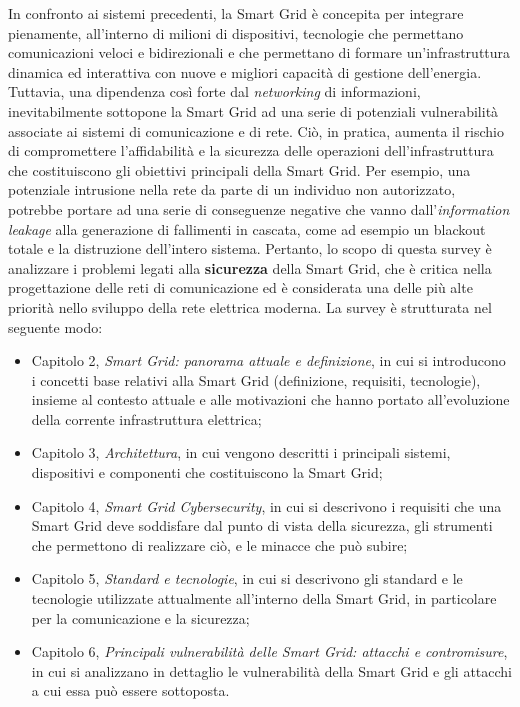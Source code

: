 In confronto ai sistemi precedenti, la Smart Grid è concepita per integrare pienamente, all'interno di milioni di dispositivi, tecnologie che permettano comunicazioni veloci e bidirezionali e che permettano di formare un'infrastruttura dinamica ed interattiva con nuove e migliori capacità di gestione dell'energia. Tuttavia, una dipendenza così forte dal \textit{networking} di informazioni, inevitabilmente sottopone la Smart Grid ad una serie di potenziali vulnerabilità associate ai sistemi di comunicazione e di rete. Ciò, in pratica, aumenta il rischio di compromettere l'affidabilità e la sicurezza delle operazioni dell'infrastruttura che costituiscono gli obiettivi principali della Smart Grid. Per esempio, una potenziale intrusione nella rete da parte di un individuo non autorizzato, potrebbe portare ad una serie di conseguenze negative che vanno dall'\textit{information leakage} alla generazione di fallimenti in cascata, come ad esempio un blackout totale e la distruzione dell'intero sistema. Pertanto, lo scopo di questa survey è analizzare i problemi legati alla \textbf{sicurezza} della Smart Grid, che è critica nella progettazione delle reti di comunicazione ed è considerata una delle più alte priorità nello sviluppo della rete elettrica moderna.
\newline \newline
La survey è strutturata nel seguente modo:
\begin{itemize}
\item Capitolo 2, \textit{Smart Grid: panorama attuale e definizione}, in cui si introducono i concetti base relativi alla Smart Grid (definizione, requisiti, tecnologie), insieme al contesto attuale e alle motivazioni che hanno portato all'evoluzione della corrente infrastruttura elettrica;
\item Capitolo 3, \textit{Architettura}, in cui vengono descritti i principali sistemi, dispositivi e componenti che costituiscono la Smart Grid;
\item Capitolo 4, \textit{Smart Grid Cybersecurity}, in cui si descrivono i requisiti che una Smart Grid deve soddisfare dal punto di vista della sicurezza, gli strumenti che permettono di realizzare ciò, e le minacce che può subire;
\item Capitolo 5, \textit{Standard e tecnologie}, in cui si descrivono gli standard e le tecnologie utilizzate attualmente all'interno della Smart Grid, in particolare per la comunicazione e la sicurezza;
\item Capitolo 6, \textit{Principali vulnerabilità delle Smart Grid: attacchi e contromisure}, in cui si analizzano in dettaglio le vulnerabilità della Smart Grid e gli attacchi a cui essa può essere sottoposta.
\end{itemize}